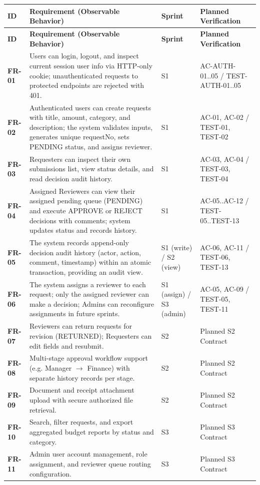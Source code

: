 \documentclass[11pt,a4paper]{article}
\begin{document}
\vspace{0.3em}
\begin{longtable}{|>{\RaggedRight}p{1.5cm}|>{\RaggedRight}p{7.0cm}|>{\centering\arraybackslash}p{1.8cm}|>{\RaggedRight}p{4.4cm}|}
\hline
\rowcolor{zenPale}\textbf{ID} & \textbf{Requirement (Observable Behavior)} & \textbf{Sprint} & \textbf{Planned\allowbreak{} Verification} \\ \hline
\endfirsthead
\hline
\rowcolor{zenPale}\textbf{ID} & \textbf{Requirement (Observable Behavior)} & \textbf{Sprint} & \textbf{Planned\allowbreak{} Verification} \\ \hline
\endhead
\hline
\endfoot
\textbf{FR-01} & Users can login, logout, and inspect current session user info via HTTP-only cookie; unauthenticated requests to protected endpoints are rejected with 401. & S1 & AC-AUTH-01..05 / TEST-AUTH-01..05 \\ \hline
\textbf{FR-02} & Authenticated users can create requests with title, amount, category, and description; the system validates inputs, generates unique requestNo, sets PENDING status, and assigns reviewer. & S1 & AC-01, AC-02 / TEST-01, TEST-02 \\ \hline
\textbf{FR-03} & Requesters can inspect their own submissions list, view status details, and read decision audit history. & S1 & AC-03, AC-04 / TEST-03, TEST-04 \\ \hline
\textbf{FR-04} & Assigned Reviewers can view their assigned pending queue (PENDING) and execute APPROVE or REJECT decisions with comments; system updates status and records history. & S1 & AC-05..AC-12 / TEST-05..TEST-13 \\ \hline
\textbf{FR-05} & The system records append-only decision audit history (actor, action, comment, timestamp) within an atomic transaction, providing an audit view. & S1 (write) / S2 (view) & AC-06, AC-11 / TEST-06, TEST-13 \\ \hline
\textbf{FR-06} & The system assigns a reviewer to each request; only the assigned reviewer can make a decision; Admins can reconfigure assignments in future sprints. & S1 (assign) / S3 (admin) & AC-05, AC-09 / TEST-05, TEST-11 \\ \hline
\textbf{FR-07} & Reviewers can return requests for revision (RETURNED); Requesters can edit fields and resubmit. & S2 & Planned S2 Contract \\ \hline
\textbf{FR-08} & Multi-stage approval workflow support (e.g. Manager $\rightarrow$ Finance) with separate history records per stage. & S2 & Planned S2 Contract \\ \hline
\textbf{FR-09} & Document and receipt attachment upload with secure authorized file retrieval. & S2 & Planned S2 Contract \\ \hline
\textbf{FR-10} & Search, filter requests, and export aggregated budget reports by status and category. & S3 & Planned S3 Contract \\ \hline
\textbf{FR-11} & Admin user account management, role assignment, and reviewer queue routing configuration. & S3 & Planned S3 Contract \\ \hline
\end{longtable}
\vspace{0.3em}
\end{document}
